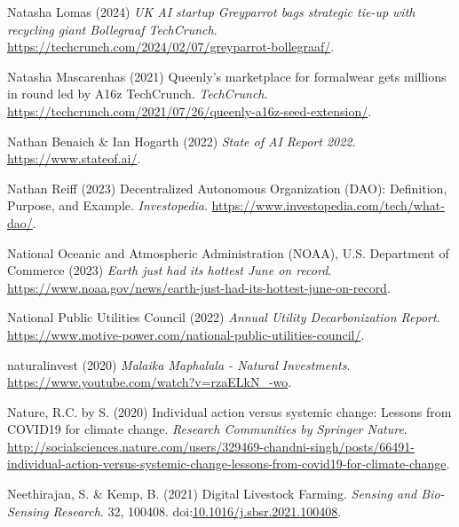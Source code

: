 \documentclass[
  letterpaper,
  DIV=11,
  numbers=noendperiod]{scrartcl}
\newlength{\cslhangindent}
\newenvironment{CSLReferences}[2] %
 {\begin{list}{}{%
  \setlength{\itemindent}{0pt}
  \setlength{\leftmargin}{0pt}
  \setlength{\parsep}{0pt}
  \ifodd #1
   \setlength{\leftmargin}{\cslhangindent}
   \setlength{\itemindent}{-1\cslhangindent}
  \fi
  \setlength{\itemsep}{#2\baselineskip}}}
 {\end{list}}
\begin{document}
\begin{CSLReferences}{0}{1}
Natasha Lomas (2024) \emph{{UK AI} startup {Greyparrot} bags strategic
tie-up with recycling giant {Bollegraaf} {\textbar} {TechCrunch}}.
\url{https://techcrunch.com/2024/02/07/greyparrot-bollegraaf/}.

Natasha Mascarenhas (2021) Queenly's marketplace for formalwear gets
millions in round led by {A16z} {\textbar} {TechCrunch}.
\emph{TechCrunch}.
\url{https://techcrunch.com/2021/07/26/queenly-a16z-seed-extension/}.

Nathan Benaich \& Ian Hogarth (2022) \emph{State of {AI Report} 2022}.
\url{https://www.stateof.ai/}.

Nathan Reiff (2023) Decentralized {Autonomous Organization} ({DAO}):
{Definition}, {Purpose}, and {Example}. \emph{Investopedia}.
\url{https://www.investopedia.com/tech/what-dao/}.

National Oceanic and Atmospheric Administration (NOAA), U.S. Department
of Commerce (2023) \emph{Earth just had its hottest {June} on record}.
\url{https://www.noaa.gov/news/earth-just-had-its-hottest-june-on-record}.

National Public Utilities Council (2022) \emph{Annual {Utility
Decarbonization Report}}.
\url{https://www.motive-power.com/national-public-utilities-council/}.

naturalinvest (2020) \emph{Malaika {Maphalala} - {Natural Investments}}.
\url{https://www.youtube.com/watch?v=rzaELkN_-wo}.

Nature, R.C. by S. (2020) Individual action versus systemic change:
Lessons from {COVID19} for climate change. \emph{Research Communities by
Springer Nature}.
\url{http://socialsciences.nature.com/users/329469-chandni-singh/posts/66491-individual-action-versus-systemic-change-lessons-from-covid19-for-climate-change}.

Neethirajan, S. \& Kemp, B. (2021) Digital {Livestock Farming}.
\emph{Sensing and Bio-Sensing Research}. 32, 100408.
doi:\href{https://doi.org/10.1016/j.sbsr.2021.100408}{10.1016/j.sbsr.2021.100408}.


\end{CSLReferences}
\end{document}
